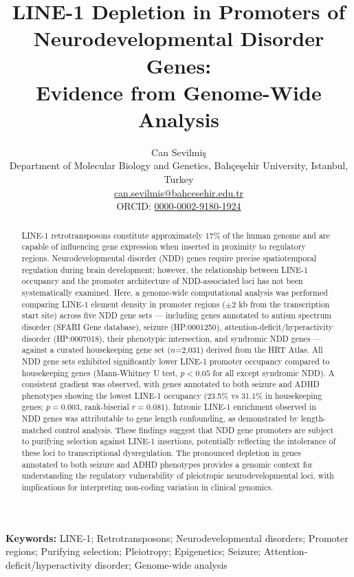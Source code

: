 \documentclass[11pt, a4paper]{article}
\title{\textbf{LINE-1 Depletion in Promoters of
Neurodevelopmental Disorder Genes:\\
Evidence from Genome-Wide Analysis}}
\author{
Can Sevilmi\c{s} \\[4pt]
\small Department of Molecular Biology and Genetics,
Bah\c{c}e\c{s}ehir University, Istanbul, Turkey \\[2pt]
\small \href{mailto:can.sevilmis@bahcesehir.edu.tr}
{can.sevilmis@bahcesehir.edu.tr} \\[2pt]
\small ORCID: \href{https://orcid.org/0000-0002-9180-1924}{0000-0002-9180-1924}
}
\date{}
\begin{document}

\maketitle
\thispagestyle{empty}

\begin{center}
\small\textbf{Keywords:} LINE-1; Retrotransposons; Neurodevelopmental disorders; Promoter regions; Purifying selection; Pleiotropy; Epigenetics; Seizure; Attention-deficit/hyperactivity disorder; Genome-wide analysis
\end{center}

\newpage

\begin{abstract}
LINE-1 retrotransposons constitute approximately 17\% of the
human genome and are capable of influencing gene expression
when inserted in proximity to regulatory regions.
Neurodevelopmental disorder (NDD) genes require precise
spatiotemporal regulation during brain development;
however, the relationship between LINE-1 occupancy and the promoter
architecture of NDD-associated loci has not been systematically
examined. Here, a genome-wide computational analysis was performed comparing LINE-1 element density in promoter regions ($\pm$2 kb from the transcription start site) across five NDD
gene sets --- including genes annotated to autism spectrum
disorder (SFARI Gene database), seizure (HP:0001250),
attention-deficit/hyperactivity disorder (HP:0007018),
their phenotypic intersection, and syndromic NDD genes ---
against a curated housekeeping gene set ($n$=2,031) derived
from the HRT Atlas. All NDD gene sets exhibited significantly
lower LINE-1 promoter occupancy compared to housekeeping genes
(Mann-Whitney U test, $p < 0.05$ for all except syndromic NDD).
A consistent gradient was observed, with genes annotated to
both seizure and ADHD phenotypes showing the lowest LINE-1
occupancy (23.5\% vs 31.1\% in housekeeping genes; $p = 0.003$,
rank-biserial $r = 0.081$). Intronic LINE-1 enrichment observed
in NDD genes was attributable to gene length confounding, as
demonstrated by length-matched control analysis. These findings
suggest that NDD gene promoters are subject to purifying
selection against LINE-1 insertions, potentially reflecting
the intolerance of these loci to transcriptional dysregulation.
The pronounced depletion in genes annotated to both seizure
and ADHD phenotypes provides a genomic context for understanding
the regulatory vulnerability of pleiotropic neurodevelopmental
loci, with implications for interpreting non-coding variation in clinical genomics.
\end{abstract}
\end{document}
